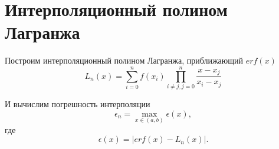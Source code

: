 \section{Интерполяционный полином Лагранжа}

Построим интерполяционный полином Лагранжа, приближающий $erf(x)$
$$
	L_n(x)=\sum\limits_{i=0}^{n}f(x_i)\prod\limits_{i \neq j, j = 0}^{n} \frac{x - x_j}{x_i-x_j}
$$

И вычислим погрешность интерполяции
$$
	\epsilon_n = \max\limits_{x \in (a, b)} \epsilon(x),
$$
где
$$
	\epsilon(x)	= \left| erf(x) - L_n(x)\right|.
$$

